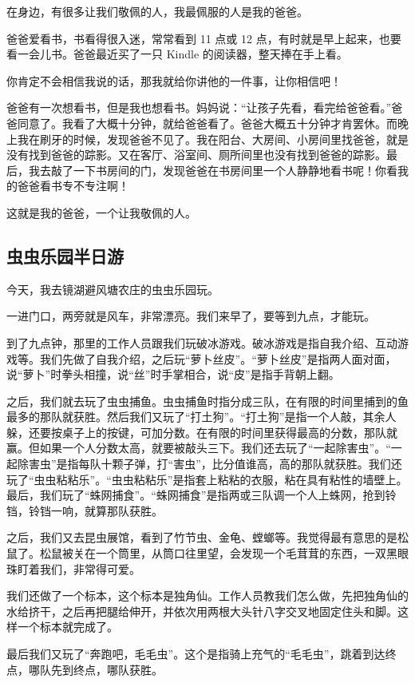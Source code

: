 \documentclass[UTF8,a4paper,titlepage,twoside,10.5pt]{article}
\begin{document}
在身边，有很多让我们敬佩的人，我最佩服的人是我的爸爸。

爸爸爱看书，书看得很入迷，常常看到 11 点或 12 点，有时就是早上起来，也要看一会儿书。爸爸最近买了一只 Kindle 的阅读器，整天捧在手上看。

你肯定不会相信我说的话，那我就给你讲他的一件事，让你相信吧！

爸爸有一次想看书，但是我也想看书。妈妈说：“让孩子先看，看完给爸爸看。”爸爸同意了。我看了大概十分钟，就给爸爸看了。爸爸大概五十分钟才肯罢休。而晚上我在刷牙的时候，发现爸爸不见了。我在阳台、大房间、小房间里找爸爸，就是没有找到爸爸的踪影。又在客厅、浴室间、厕所间里也没有找到爸爸的踪影。最后，我去敲了一下书房间的门，发现爸爸在书房间里一个人静静地看书呢！你看我的爸爸看书专不专注啊！

这就是我的爸爸，一个让我敬佩的人。

\subsection{虫虫乐园半日游}
\label{sec:org89a96c2}

今天，我去镜湖避风塘农庄的虫虫乐园玩。

一进门口，两旁就是风车，非常漂亮。我们来早了，要等到九点，才能玩。

到了九点钟，那里的工作人员跟我们玩破冰游戏。破冰游戏是指自我介绍、互动游戏等。我们先做了自我介绍，之后玩“萝卜丝皮”。“萝卜丝皮”是指两人面对面，说“萝卜”时拳头相撞，说“丝”时手掌相合，说“皮”是指手背朝上翻。

之后，我们就去玩了虫虫捕鱼。虫虫捕鱼时指分成三队，在有限的时间里捕到的鱼最多的那队就获胜。然后我们又玩了“打土狗”。“打土狗”是指一个人敲，其余人躲，还要按桌子上的按键，可加分数。在有限的时间里获得最高的分数，那队就赢。但如果一个人分数太高，就要被敲头三下。我们还去玩了“一起除害虫”。“一起除害虫”是指每队十颗子弹，打“害虫”，比分值谁高，高的那队就获胜。我们还玩了“虫虫粘粘乐”。“虫虫粘粘乐”是指套上粘粘的衣服，粘在具有粘性的墙壁上。最后，我们玩了“蛛网捕食”。“蛛网捕食”是指两或三队调一个人上蛛网，抢到铃铛，铃铛一响，就算那队获胜。

之后，我们又去昆虫展馆，看到了竹节虫、金龟、螳螂等。我觉得最有意思的是松鼠了。松鼠被关在一个筒里，从筒口往里望，会发现一个毛茸茸的东西，一双黑眼珠盯着我们，非常得可爱。

我们还做了一个标本，这个标本是独角仙。工作人员教我们怎么做，先把独角仙的水给挤干，之后再把腿给伸开，并依次用两根大头针八字交叉地固定住头和脚。这样一个标本就完成了。

最后我们又玩了“奔跑吧，毛毛虫”。这个是指骑上充气的“毛毛虫”，跳着到达终点，哪队先到终点，哪队获胜。
\end{document}
